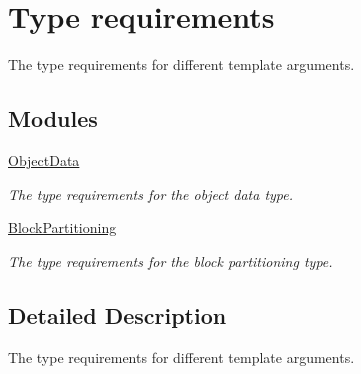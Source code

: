 \hypertarget{group__type__requirements}{\section{Type requirements}
\label{group__type__requirements}
}


The type requirements for different template arguments.  


\subsection*{Modules}
\begin{DoxyCompactItemize}
\item 
\hyperlink{group__object__data}{Object\-Data}
\begin{DoxyCompactList}\small\item\em The type requirements for the object data type. \end{DoxyCompactList}\item 
\hyperlink{group__block__partitioning}{Block\-Partitioning}
\begin{DoxyCompactList}\small\item\em The type requirements for the block partitioning type. \end{DoxyCompactList}\end{DoxyCompactItemize}


\subsection{Detailed Description}
The type requirements for different template arguments. 